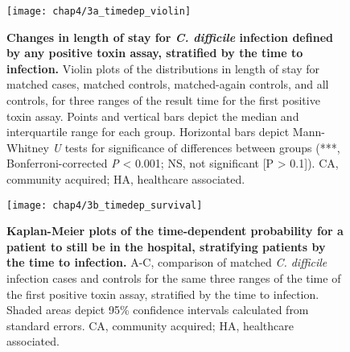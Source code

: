 \begin{figure}[htb]
  \texttt{[image: chap4/3a\_timedep\_violin]}
  \caption[Changes in length of stay for \emph{C. difficile} infection defined by any positive toxin assay and stratified by the time to infection]{
    \textbf{Changes in length of stay for \emph{C. difficile} infection defined by any positive toxin assay, stratified by the time to infection.} Violin plots of the distributions in length of stay for matched cases, matched controls, matched-again controls, and all controls, for three ranges of the result time for the first positive toxin assay. Points and vertical bars depict the median and interquartile range for each group. Horizontal bars depict Mann-Whitney \emph{U} tests for significance of differences between groups (***, Bonferroni-corrected \emph{P} < 0.001; NS, not significant [P > 0.1]). CA, community acquired; HA, healthcare associated.
  }
  \label{fig:timedep_violin}
\end{figure}
\begin{figure}[htb]
  \texttt{[image: chap4/3b\_timedep\_survival]}
  \caption[Kaplan-Meier plots for length of stay, stratifying patients by the time to infection]{\textbf{Kaplan-Meier plots of the time-dependent probability for a patient to still be in the hospital, stratifying patients by the time to infection.} A-C, comparison of matched \emph{C. difficile} infection cases and controls for the same three ranges of the time of the first positive toxin assay, stratified by the time to infection. Shaded areas depict 95\% confidence intervals calculated from standard errors. CA, community acquired; HA, healthcare associated.
  }
  \label{fig:timedep_survival}
\end{figure}

